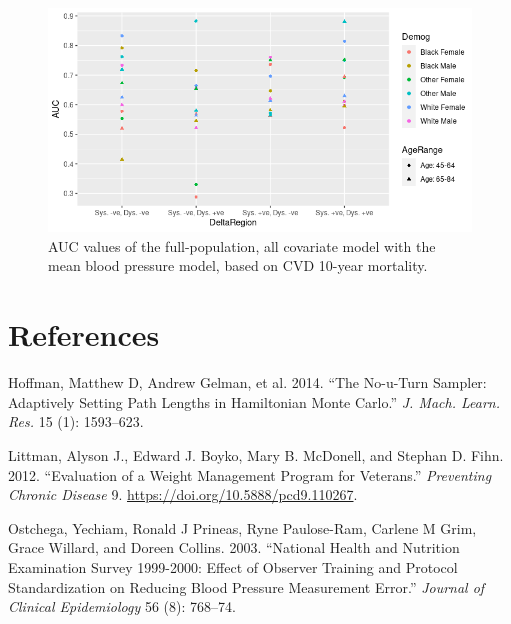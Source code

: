 \documentclass[
]{article}
\newlength{\cslhangindent}
\newlength{\cslentryspacingunit} %
\newenvironment{CSLReferences}[2] %
 {%
  \setlength{\parindent}{0pt}
  \ifodd #1
  \let\oldpar\par
  \def\par{\hangindent=\cslhangindent\oldpar}
  \fi
  \setlength{\parskip}{#2\cslentryspacingunit}
 }%
 {}
\begin{document}
\begin{figure}
\hypertarget{fig:DeltaAUCs}{%
\centering
\includegraphics{./Rmarkdown_Plots/DeltaDirection_AUCs.png}
\caption{AUC values of the full-population, all covariate model with the mean blood pressure model, based on CVD 10-year mortality.}\label{fig:DeltaAUCs}
}
\end{figure}

\hypertarget{references}{%
\section*{References}\label{references}}

\hypertarget{refs}{}
\begin{CSLReferences}{1}{0}
\leavevmode{}%
Hoffman, Matthew D, Andrew Gelman, et al. 2014. {``The No-u-Turn Sampler: Adaptively Setting Path Lengths in Hamiltonian Monte Carlo.''} \emph{J. Mach. Learn. Res.} 15 (1): 1593--623.

\leavevmode{}%
Littman, Alyson J., Edward J. Boyko, Mary B. McDonell, and Stephan D. Fihn. 2012. {``Evaluation of a Weight Management Program for Veterans.''} \emph{Preventing Chronic Disease} 9. \url{https://doi.org/10.5888/pcd9.110267}.

\leavevmode{}%
Ostchega, Yechiam, Ronald J Prineas, Ryne Paulose-Ram, Carlene M Grim, Grace Willard, and Doreen Collins. 2003. {``National Health and Nutrition Examination Survey 1999-2000: Effect of Observer Training and Protocol Standardization on Reducing Blood Pressure Measurement Error.''} \emph{Journal of Clinical Epidemiology} 56 (8): 768--74.

\end{CSLReferences}
\end{document}
